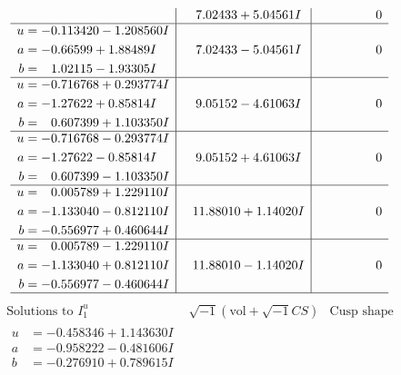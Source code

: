\documentclass[1p]{elsarticle_modified}
\theoremstyle{definition}
\newcommand{\I}{\sqrt{-1}}
\begin{document}
$$\begin{array}{c|c|c}
 & \phantom{-}7.02433 + 5.04561 I & \phantom{-0.000000 } 0 \\ \hline\begin{aligned}
u &= -0.113420 - 1.208560 I \\
a &= -0.66599 + 1.88489 I \\
b &= \phantom{-}1.02115 - 1.93305 I\end{aligned}
 & \phantom{-}7.02433 - 5.04561 I & \phantom{-0.000000 } 0 \\ \hline\begin{aligned}
u &= -0.716768 + 0.293774 I \\
a &= -1.27622 + 0.85814 I \\
b &= \phantom{-}0.607399 + 1.103350 I\end{aligned}
 & \phantom{-}9.05152 - 4.61063 I & \phantom{-0.000000 } 0 \\ \hline\begin{aligned}
u &= -0.716768 - 0.293774 I \\
a &= -1.27622 - 0.85814 I \\
b &= \phantom{-}0.607399 - 1.103350 I\end{aligned}
 & \phantom{-}9.05152 + 4.61063 I & \phantom{-0.000000 } 0 \\ \hline\begin{aligned}
u &= \phantom{-}0.005789 + 1.229110 I \\
a &= -1.133040 - 0.812110 I \\
b &= -0.556977 + 0.460644 I\end{aligned}
 & \phantom{-}11.88010 + 1.14020 I & \phantom{-0.000000 } 0 \\ \hline\begin{aligned}
u &= \phantom{-}0.005789 - 1.229110 I \\
a &= -1.133040 + 0.812110 I \\
b &= -0.556977 - 0.460644 I\end{aligned}
 & \phantom{-}11.88010 - 1.14020 I & \phantom{-0.000000 } 0\\
 \hline 
 \end{array}$$\newpage$$\begin{array}{c|c|c}  
\text{Solutions to }I^u_{1}& \I (\text{vol} + \sqrt{-1}CS) & \text{Cusp shape}\\
 \hline 
\begin{aligned}
u &= -0.458346 + 1.143630 I \\
a &= -0.958222 - 0.481606 I \\
b &= -0.276910 + 0.789615 I\end{aligned}

\end{array}$$
\end{document}
